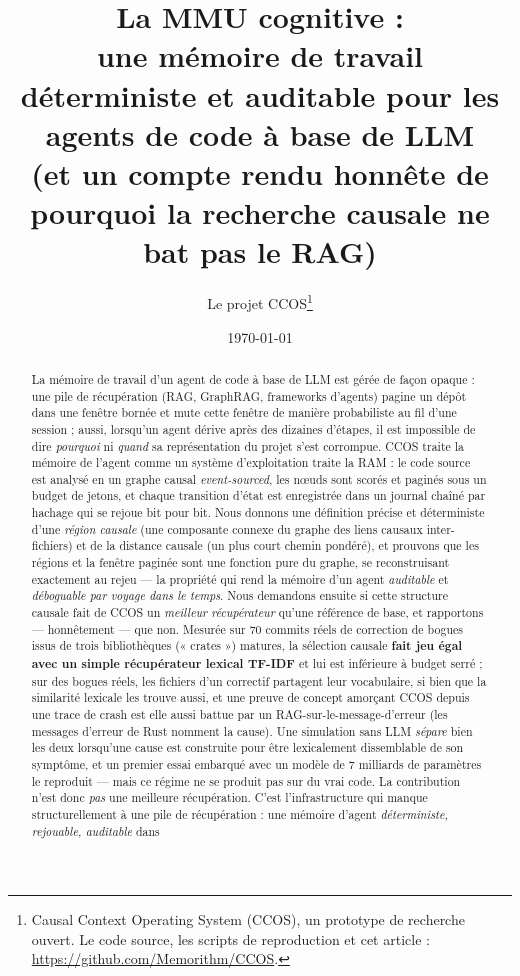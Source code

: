 \documentclass[11pt]{article}
\title{\textbf{La MMU cognitive :\\ une mémoire de travail déterministe et auditable pour les agents de code à base de LLM\\ \large (et un compte rendu honnête de pourquoi la recherche causale ne bat pas le RAG)}}
\author{Le projet CCOS\thanks{Causal Context Operating System (CCOS), un prototype
de recherche ouvert. Le code source, les scripts de reproduction et cet article :
\url{https://github.com/Memorithm/CCOS}.}}
\date{\today}
\begin{document}
\maketitle

\begin{abstract}
La mémoire de travail d'un agent de code à base de LLM est gérée de façon opaque :
une pile de récupération (RAG, GraphRAG, frameworks d'agents) pagine un dépôt dans
une fenêtre bornée et mute cette fenêtre de manière probabiliste au fil d'une
session ; aussi, lorsqu'un agent dérive après des dizaines d'étapes, il est
impossible de dire \emph{pourquoi} ni \emph{quand} sa représentation du projet
s'est corrompue. CCOS traite la mémoire de l'agent comme un système d'exploitation
traite la RAM : le code source est analysé en un graphe causal \emph{event-sourced},
les nœuds sont scorés et paginés sous un budget de jetons, et chaque transition
d'état est enregistrée dans un journal chaîné par hachage qui se rejoue bit pour
bit. Nous donnons une définition précise et déterministe d'une \emph{région causale}
(une composante connexe du graphe des liens causaux inter-fichiers) et de la
distance causale (un plus court chemin pondéré), et prouvons que les régions et la
fenêtre paginée sont une fonction pure du graphe, se reconstruisant exactement au
rejeu --- la propriété qui rend la mémoire d'un agent \emph{auditable} et
\emph{déboguable par voyage dans le temps}. Nous demandons ensuite si cette structure
causale fait de CCOS un \emph{meilleur récupérateur} qu'une référence de base, et
rapportons --- honnêtement --- que non. Mesurée sur $70$ commits réels de correction
de bogues issus de trois bibliothèques (« crates ») matures, la sélection causale
\textbf{fait jeu égal avec un simple récupérateur lexical TF-IDF} et lui est
inférieure à budget serré ; sur des bogues réels, les fichiers d'un correctif
partagent leur vocabulaire, si bien que la similarité lexicale les trouve aussi, et
une preuve de concept amorçant CCOS depuis une trace de crash est elle aussi battue
par un RAG-sur-le-message-d'erreur (les messages d'erreur de Rust nomment la cause).
Une simulation sans LLM \emph{sépare} bien les deux lorsqu'une cause est construite
pour être lexicalement dissemblable de son symptôme, et un premier essai embarqué
avec un modèle de $7$ milliards de paramètres le reproduit --- mais ce régime ne se
produit pas sur du vrai code. La contribution n'est donc \emph{pas} une meilleure
récupération. C'est l'infrastructure qui manque structurellement à une pile de
récupération : une mémoire d'agent \emph{déterministe, rejouable, auditable} dans

\end{abstract}
\end{document}
